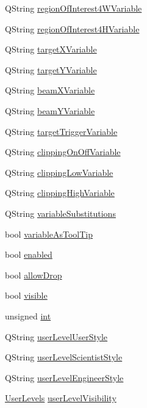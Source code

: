 \begin{DoxyCompactItemize}
\item 
QString \hyperlink{classQEImage_af351ddd82e7c4041784b7cce52ab8794}{regionOfInterest4WVariable}
\item 
QString \hyperlink{classQEImage_a26954e75f3b5dfca80be2a3db7d61e1c}{regionOfInterest4HVariable}
\item 
QString \hyperlink{classQEImage_a39f8ca186452b20bbc5c3a379fbc302a}{targetXVariable}
\item 
QString \hyperlink{classQEImage_af4dfc361d50d15cc517b099e33b3f288}{targetYVariable}
\item 
QString \hyperlink{classQEImage_a14a97754a61ed1d4228004ad17b64043}{beamXVariable}
\item 
QString \hyperlink{classQEImage_a3a264cf7ff6d4068ca7151f979a1f2c9}{beamYVariable}
\item 
QString \hyperlink{classQEImage_afa8ff630ef168bfa3db1c496f0957497}{targetTriggerVariable}
\item 
QString \hyperlink{classQEImage_aea0af2edf712740337565a76b08cb22e}{clippingOnOffVariable}
\item 
QString \hyperlink{classQEImage_a12123766faf188fbf04d98de392bffd9}{clippingLowVariable}
\item 
QString \hyperlink{classQEImage_ac0aa101dc9f8ffdd2a39b4812372573b}{clippingHighVariable}
\item 
QString \hyperlink{classQEImage_aee84acf36f836245b576d9d4066f70fa}{variableSubstitutions}
\item 
bool \hyperlink{classQEImage_a6e3d7da4bcac6579ac582fe5c18ed405}{variableAsToolTip}
\item 
bool \hyperlink{classQEImage_aa7622e2272c1c1bdd0f51b6bfb9ec048}{enabled}
\item 
bool \hyperlink{classQEImage_abf2d95e9f4cb90d78ab42ca530ca64df}{allowDrop}
\item 
bool \hyperlink{classQEImage_a759388af5e06a2a86e300e1a5b6ce532}{visible}
\item 
unsigned \hyperlink{classQEImage_ad4c74aff58e2a7a9ae21980613599708}{int}
\item 
QString \hyperlink{classQEImage_af5a40862b28b5abba789f4db44906dfc}{userLevelUserStyle}
\item 
QString \hyperlink{classQEImage_abeafe47e5e31d857f6a0f7786261a4c3}{userLevelScientistStyle}
\item 
QString \hyperlink{classQEImage_abc791a3195ff70845933dd213439fc69}{userLevelEngineerStyle}
\item 
\hyperlink{classQEImage_afc6169e5bb55dd0d3757ba09e3afe335}{UserLevels} \hyperlink{classQEImage_a777c21b8780f53a99f930ca19dc5cbe5}{userLevelVisibility}

\end{DoxyCompactItemize}
